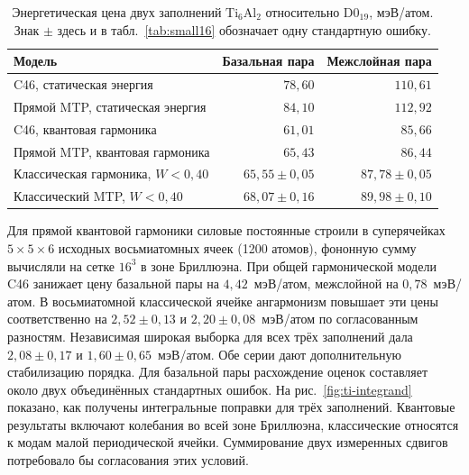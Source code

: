 \documentclass[11pt,a4paper]{article}
\begin{document}
\begin{table}[htbp]
\centering\small
\caption{Энергетическая цена двух заполнений $\mathrm{Ti}_6\mathrm{Al}_2$
относительно D0$_{19}$, мэВ/атом. Знак $\pm$ здесь и в
табл.~\ref{tab:small16} обозначает одну стандартную ошибку.}
\label{tab:small8}
\begin{tabular}{@{}lrr@{}}
\toprule
Модель & Базальная пара & Межслойная пара\\
\midrule
C46, статическая энергия & $78{,}60$ & $110{,}61$\\
Прямой MTP, статическая энергия & $84{,}10$ & $112{,}92$\\
C46, квантовая гармоника & $61{,}01$ & $85{,}66$\\
Прямой MTP, квантовая гармоника & $65{,}43$ & $86{,}44$\\
Классическая гармоника, $W<0{,}40$ & $65{,}55\pm0{,}05$ & $87{,}78\pm0{,}05$\\
Классический MTP, $W<0{,}40$ & $68{,}07\pm0{,}16$ & $89{,}98\pm0{,}10$\\
\bottomrule
\end{tabular}
\end{table}

Для прямой квантовой гармоники силовые постоянные строили в суперячейках
$5\times5\times6$ исходных восьмиатомных ячеек (1200 атомов), фононную
сумму вычисляли на сетке $16^3$ в зоне Бриллюэна. При общей гармонической
модели C46 занижает цену базальной пары на $4{,}42$~мэВ/атом, межслойной
на $0{,}78$~мэВ/атом. В восьмиатомной классической ячейке ангармонизм
повышает эти цены соответственно на $2{,}52\pm0{,}13$ и
$2{,}20\pm0{,}08$~мэВ/атом по согласованным разностям. Независимая широкая
выборка для всех трёх заполнений дала $2{,}08\pm0{,}17$ и
$1{,}60\pm0{,}65$~мэВ/атом. Обе серии дают дополнительную стабилизацию порядка.
Для базальной пары расхождение оценок составляет около двух объединённых
стандартных ошибок. На рис.~\ref{fig:ti-integrand} показано, как
получены интегральные поправки для трёх заполнений. Квантовые результаты включают колебания во всей зоне
Бриллюэна, классические относятся к модам малой периодической ячейки.
Суммирование двух измеренных сдвигов потребовало бы согласования этих условий.
\end{document}
